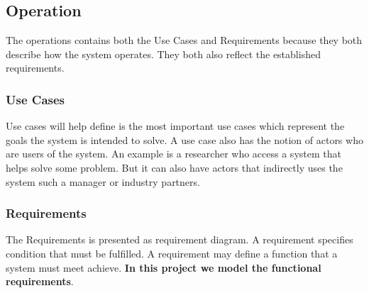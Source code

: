\subsection{Operation}\label{sc:operation}
The operations contains both the Use Cases and Requirements because they both describe how the system operates. They both also reflect the established requirements.

\subsubsection{Use Cases}\label{ssc:usecases}
Use cases will help define is the most important use cases which represent the goals the system is intended to solve. A use case also has the notion of actors who are users of the system. An example is a researcher who access a system that helps solve some problem. But it can also have actors that indirectly uses the system such a manager or industry partners.

\subsubsection{Requirements}\label{ssc:requirements}
The Requirements is presented as requirement diagram. A requirement specifies condition that must be fulfilled. A requirement may define a function that a system must meet achieve. \textbf{In this project we model the functional requirements}.